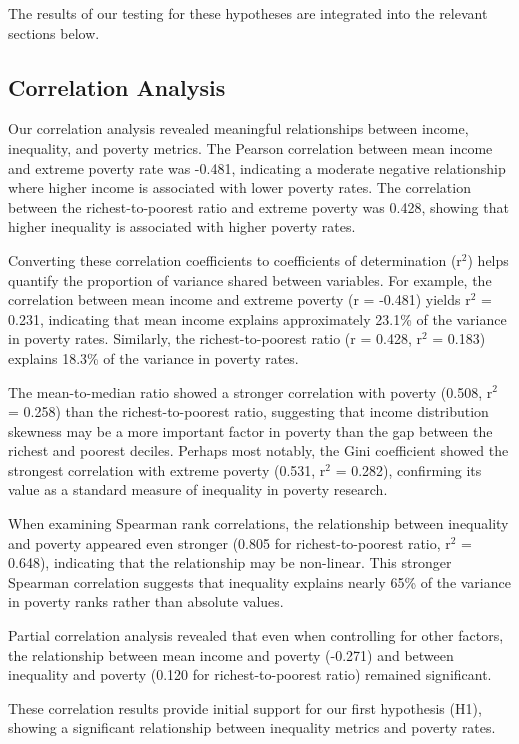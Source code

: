 \documentclass[12pt,a4paper]{article}
\begin{document}
The results of our testing for these hypotheses are integrated into the relevant sections below.

\subsection{Correlation Analysis}
Our correlation analysis revealed meaningful relationships between income, inequality, and poverty metrics. The Pearson correlation between mean income and extreme poverty rate was -0.481, indicating a moderate negative relationship where higher income is associated with lower poverty rates. The correlation between the richest-to-poorest ratio and extreme poverty was 0.428, showing that higher inequality is associated with higher poverty rates.

Converting these correlation coefficients to coefficients of determination (r$^2$) helps quantify the proportion of variance shared between variables. For example, the correlation between mean income and extreme poverty (r = -0.481) yields r$^2$ = 0.231, indicating that mean income explains approximately 23.1\% of the variance in poverty rates. Similarly, the richest-to-poorest ratio (r = 0.428, r$^2$ = 0.183) explains 18.3\% of the variance in poverty rates.

The mean-to-median ratio showed a stronger correlation with poverty (0.508, r$^2$ = 0.258) than the richest-to-poorest ratio, suggesting that income distribution skewness may be a more important factor in poverty than the gap between the richest and poorest deciles. Perhaps most notably, the Gini coefficient showed the strongest correlation with extreme poverty (0.531, r$^2$ = 0.282), confirming its value as a standard measure of inequality in poverty research.

When examining Spearman rank correlations, the relationship between inequality and poverty appeared even stronger (0.805 for richest-to-poorest ratio, r$^2$ = 0.648), indicating that the relationship may be non-linear. This stronger Spearman correlation suggests that inequality explains nearly 65\% of the variance in poverty ranks rather than absolute values.

Partial correlation analysis revealed that even when controlling for other factors, the relationship between mean income and poverty (-0.271) and between inequality and poverty (0.120 for richest-to-poorest ratio) remained significant.

These correlation results provide initial support for our first hypothesis (H1), showing a significant relationship between inequality metrics and poverty rates.
\end{document}
